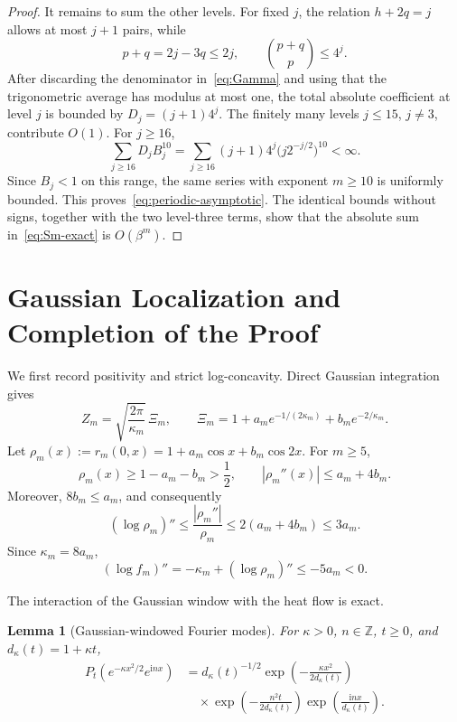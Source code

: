 \documentclass[10pt,letterpaper,journal]{IEEEtran}
\newcommand{\Z}{\mathbb{Z}}
\newcommand{\ii}{\mathrm{i}}
\theoremstyle{plain}
\newtheorem{lemma}[theorem]{Lemma}
\theoremstyle{definition}
\begin{document}
\begin{proof}
It remains to sum the other levels. For fixed $j$, the relation
$h+2q=j$ allows at most $j+1$ pairs, while
\[
 p+q=2j-3q\le2j,
 \qquad
 \binom{p+q}{p}\le4^j.
\]
After discarding the denominator in~\eqref{eq:Gamma} and using that the
trigonometric average has modulus at most one, the total absolute coefficient
at level $j$ is bounded by $D_j=(j+1)4^j$. The finitely many levels
$j\le15$, $j\ne3$, contribute $O(1)$. For $j\ge16$,
\[
 \sum_{j\ge16}D_jB_j^{10}
 =\sum_{j\ge16}(j+1)4^j
 \bigl(j2^{-j/2}\bigr)^{10}<\infty.
\]
Since $B_j<1$ on this range, the same series with exponent $m\ge10$ is
uniformly bounded. This proves~\eqref{eq:periodic-asymptotic}. The identical
bounds without signs, together with the two level-three terms, show that the
absolute sum in~\eqref{eq:Sm-exact} is $O(\beta^m)$.
\end{proof}

\section{Gaussian Localization and Completion of the Proof}
\label{sec:transfer}

We first record positivity and strict log-concavity. Direct Gaussian
integration gives
\begin{equation}
 Z_m=\sqrt{\frac{2\pi}{\kappa_m}}\,\Xi_m,
 \qquad
 \Xi_m=1+a_me^{-1/(2\kappa_m)}+b_me^{-2/\kappa_m}.
 \label{eq:normalization}
\end{equation}
Let $\rho_m(x):=r_m(0,x)=1+a_m\cos x+b_m\cos2x$. For $m\ge5$,
\[
 \rho_m(x)\ge1-a_m-b_m>\frac12,
 \qquad |\rho_m''(x)|\le a_m+4b_m.
\]
Moreover, $8b_m\le a_m$, and consequently
\[
 (\log \rho_m)''
 \le\frac{|\rho_m''|}{\rho_m}
 \le2(a_m+4b_m)\le3a_m.
\]
Since $\kappa_m=8a_m$,
\begin{equation}
 (\log f_m)''=-\kappa_m+(\log \rho_m)''
 \le-5a_m<0.
 \label{eq:log-concavity}
\end{equation}

The interaction of the Gaussian window with the heat flow is exact.

\begin{lemma}[Gaussian-windowed Fourier modes]
\label{lem:heat-mode}
For $\kappa>0$, $n\in\Z$, $t\ge0$, and $d_\kappa(t)=1+\kappa t$,
\begin{equation}
 \begin{aligned}
 P_t\!\left(e^{-\kappa x^2/2}e^{\ii nx}\right)
 &=d_\kappa(t)^{-1/2}
 \exp\!\left(-\frac{\kappa x^2}{2d_\kappa(t)}\right)\\
 &\quad\times
 \exp\!\left(-\frac{n^2t}{2d_\kappa(t)}\right)
 \exp\!\left(\frac{\ii nx}{d_\kappa(t)}\right).
 \end{aligned}
 \label{eq:heat-mode}
\end{equation}
\end{lemma}
\end{document}
